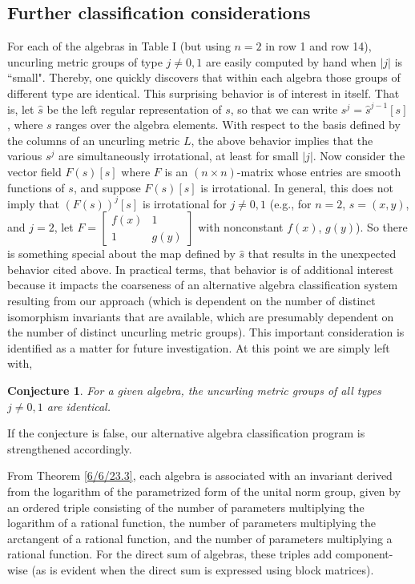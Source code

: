 \documentclass{amsart}
\numberwithin{equation}{section}
\newtheorem*{conjecture}{Conjecture}
\theoremstyle{definition}
\numberwithin{theorem}{section}
\begin{document}
\subsection{Further classification considerations} For each of the algebras in Table I (but using $n=2$ in row 1 and row 14), uncurling metric groups of type $j\ne 0,1$ are easily computed by hand when  $|j|$ is ``small".  
Thereby, one quickly discovers that within each algebra those groups of different type are identical.  This surprising behavior is of interest in itself.  That is, let $\hat{s}$ be the left regular representation of $s$, so that we can write $s^j = \hat{s}^{j-1}[s]$, where $s$ ranges over the algebra elements. With respect to the basis defined by the columns of an uncurling metric $L$, the above behavior implies that the various $s^j$ are simultaneously irrotational, at least for small $|j|$.  Now consider the vector field $F(s)[s]$ where $F$ is an \mbox{$(n\times n)$-matrix} whose entries are smooth functions of $s$, and suppose $F(s)[s]$ is irrotational.  In general, this does not imply that $(F(s))^j[s]$ is irrotational for $j\ne 0,1$ (e.g., for \mbox{$n=2$}, $s=(x,y)$, and $j=2$, let $F= \left[\begin{array}{ccc}
 f(x) & 1   \\ 
 1 & g(y)    
\end{array}\right]$ with nonconstant $f(x)$, $g(y)$).  So there is something special about the map defined by $\hat{s}$ that results in the unexpected behavior cited above. 
In practical terms, that behavior is of additional interest because it impacts the coarseness of an alternative algebra classification system resulting from our approach (which is dependent on the number of distinct isomorphism invariants that are available, which are presumably dependent on the number of distinct uncurling metric groups).  This important consideration is identified as a matter for future investigation. At this point we are simply left with,
\begin{conjecture} For a given algebra, the uncurling metric groups of all types $j\ne 0,1$ are identical. 
\end{conjecture}
\noindent If the conjecture is false, our alternative algebra classification program is strengthened accordingly.

 From Theorem \ref{6/6/23.3}, each algebra is associated with an invariant derived from the logarithm of the parametrized form of the unital norm group, given by an ordered triple consisting of the number of parameters multiplying the logarithm of a rational function, the number of parameters multiplying the arctangent of a rational function, and the
 \enlargethispage{1cm} number of parameters multiplying a rational function.  For the direct sum of algebras, these triples add component-wise (as is evident when the direct sum is expressed using block matrices).
\end{document}
